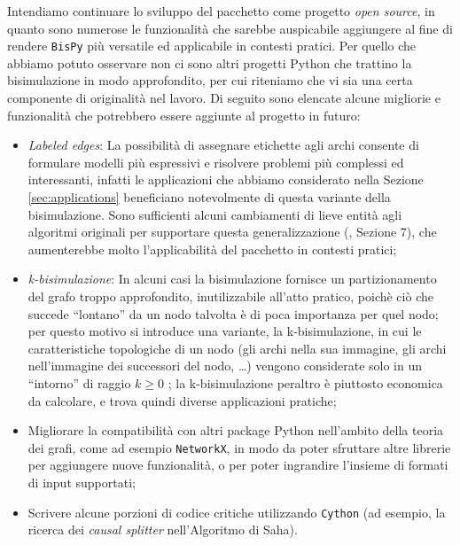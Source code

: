 Intendiamo continuare lo sviluppo del pacchetto come progetto \emph{open source}, in quanto sono numerose le funzionalità che sarebbe auspicabile aggiungere al fine di rendere \texttt{BisPy} più versatile ed applicabile in contesti pratici. Per quello che abbiamo potuto osservare non ci sono altri progetti Python che trattino la bisimulazione in modo approfondito, per cui riteniamo che vi sia una certa componente di originalità nel lavoro. Di seguito sono elencate alcune migliorie e funzionalità che potrebbero essere aggiunte al progetto in futuro:
\begin{itemize}
    \item \emph{Labeled edges}: La possibilità di assegnare etichette agli archi consente di formulare modelli più espressivi e risolvere problemi più complessi ed interessanti, infatti le applicazioni che abbiamo considerato nella Sezione \ref{sec:applications} beneficiano notevolmente di questa variante della bisimulazione. Sono sufficienti alcuni cambiamenti di lieve entità agli algoritmi originali per supportare questa generalizzazione (\cite{dovier}, Sezione 7), che aumenterebbe molto l'applicabilità del pacchetto in contesti pratici;
    \item \emph{k-bisimulazione}: In alcuni casi la bisimulazione fornisce un partizionamento del grafo troppo approfondito, inutilizzabile all'atto pratico, poichè ciò che succede ``lontano'' da un nodo talvolta è di poca importanza per quel nodo; per questo motivo si introduce una variante, la k-bisimulazione, in cui le caratteristiche topologiche di un nodo (gli archi nella sua immagine, gli archi nell'immagine dei successori del nodo, \dots) vengono considerate solo in un ``intorno'' di raggio $k \geq 0$ \cite{kbisi}; la k-bisimulazione peraltro è piuttosto economica da calcolare, e trova quindi diverse applicazioni pratiche;
    \item Migliorare la compatibilità con altri package Python nell'ambito della teoria dei grafi, come ad esempio \texttt{NetworkX}, in modo da poter sfruttare altre librerie per aggiungere nuove funzionalità, o per poter ingrandire l'insieme di formati di input supportati;
    \item Scrivere alcune porzioni di codice critiche utilizzando \texttt{Cython} (ad esempio, la ricerca dei \emph{causal splitter} nell'Algoritmo di Saha).
\end{itemize}
